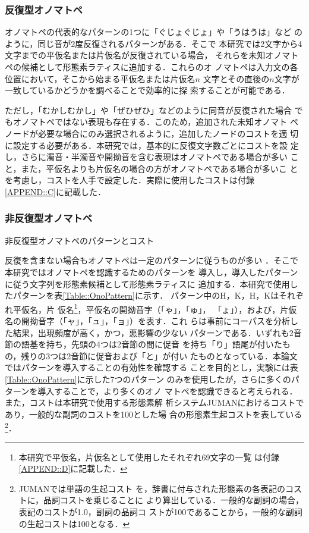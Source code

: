 \documentclass[japanese]{jnlp_1.4}
\begin{document}
   \subsubsection{反復型オノマトペ}

   オノマトペの代表的なパターンの1つに「ぐじょぐじょ」や「うはうは」など
   のように，同じ音が2度反復されるパターンがある\cite{Kakai1993}．そこで
   本研究では2文字から4文字までの平仮名または片仮名が反復されている場合，
   それらを未知オノマトペの候補として形態素ラティスに追加する．これらのオ
   ノマトペは入力文の各位置において，そこから始まる平仮名または片仮名$n$
   文字とその直後の$n$文字が一致しているかどうかを調べることで効率的に探
   索することが可能である．

   ただし，「むかしむかし」や「ぜひぜひ」などのように同音が反復された場合
   でもオノマトペではない表現も存在する．このため，追加された未知オノマト
   ペノードが必要な場合にのみ選択されるように，追加したノードのコストを適
   切に設定する必要がある．本研究では，基本的に反復文字数ごとにコストを設
   定し，さらに濁音・半濁音や開拗音を含む表現はオノマトペである場合が多い
   こと，また，平仮名よりも片仮名の場合の方がオノマトペである場合が多いこ
   とを考慮し，コストを人手で設定した．実際に使用したコストは付録
   \ref{APPEND::C}に記載した．


   \subsubsection{非反復型オノマトペ}

   \begin{table}[b]
    \caption{非反復型オノマトペのパターンとコスト}
    \label{Table::OnoPattern}

   \end{table}
   
   反復を含まない場合もオノマトペは一定のパターンに従うものが多い
   \cite{Kakai1993}．そこで本研究ではオノマトペを認識するためのパターンを
   導入し，導入したパターンに従う文字列を形態素候補として形態素ラティスに
   追加する．本研究で使用したパターンを表\ref{Table::OnoPattern}に示す．
   パターン中のH，K，{\scriptsize H}，{\scriptsize K}はそれぞれ平仮名，片
   仮名\footnote{本研究で平仮名，片仮名として使用したそれぞれ69文字の一覧
   は付録\ref{APPEND::D}に記載した．}，平仮名の開拗音字（「ゃ」，「ゅ」，
   「ょ」），および，片仮名の開拗音字（「ャ」，「ュ」，「ョ」）を表す．これ
   らは事前にコーパスを分析した結果，出現頻度が高く，かつ，悪影響の少ない
   パターンである．いずれも2音節の語基を持ち，先頭の4つは2音節の間に促音
   を持ち「り」語尾が付いたもの，残りの3つは2音節に促音および「と」が付い
   たものとなっている．本論文ではパターンを導入することの有効性を確認する
   ことを目的とし，実験には表\ref{Table::OnoPattern}に示した7つのパターン
   のみを使用したが，さらに多くのパターンを導入することで，より多くのオノ
   マトペを認識できると考えられる．また，コストは本研究で使用する形態素解
   析システムJUMANにおけるコストであり，一般的な副詞のコストを100とした場
   合の形態素生起コストを表している\footnote{JUMANでは単語の生起コスト
   を，辞書に付与された形態素の各表記のコストに，品詞コストを乗じることに
   より算出している．一般的な副詞の場合，表記のコストが1.0，副詞の品詞コ
   ストが100であることから，一般的な副詞の生起コストは100となる．}．
\end{document}
